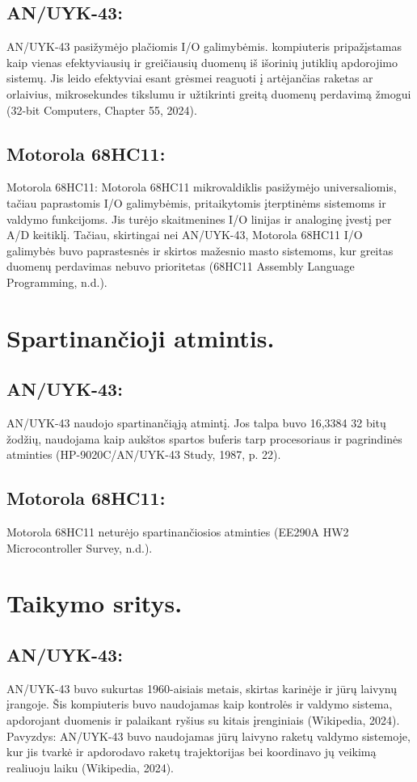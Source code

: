 \documentclass[a4paper,12pt]{article}
\begin{document}
\subsection{AN/UYK-43:}
AN/UYK-43 pasižymėjo plačiomis I/O galimybėmis. kompiuteris pripažįstamas kaip vienas efektyviausių ir greičiausių duomenų iš išorinių jutiklių apdorojimo sistemų. Jis leido efektyviai esant grėsmei reaguoti į artėjančias raketas ar orlaivius, mikrosekundes tikslumu ir užtikrinti greitą duomenų perdavimą žmogui (32-bit Computers, Chapter 55, 2024).
\subsection{Motorola 68HC11:}
Motorola 68HC11: Motorola 68HC11 mikrovaldiklis pasižymėjo universaliomis, tačiau paprastomis I/O galimybėmis, pritaikytomis įterptinėms sistemoms ir valdymo funkcijoms. Jis turėjo skaitmenines I/O linijas ir analoginę įvestį per A/D keitiklį. Tačiau, skirtingai nei AN/UYK-43, Motorola 68HC11 I/O galimybės buvo paprastesnės ir skirtos mažesnio masto sistemoms, kur greitas duomenų perdavimas nebuvo prioritetas (68HC11 Assembly Language Programming, n.d.).

\section{Spartinančioji atmintis.}
\subsection{AN/UYK-43:}
AN/UYK-43 naudojo spartinančiąją atmintį. Jos talpa buvo 16,3384 32 bitų žodžių, naudojama kaip aukštos spartos buferis tarp procesoriaus ir pagrindinės atminties (HP-9020C/AN/UYK-43 Study, 1987, p. 22).
\subsection{Motorola 68HC11:}
Motorola 68HC11 neturėjo spartinančiosios atminties (EE290A HW2 Microcontroller Survey, n.d.).

\section{Taikymo sritys.}
\subsection{AN/UYK-43:}
AN/UYK-43 buvo sukurtas 1960-aisiais metais, skirtas karinėje ir jūrų laivynų įrangoje. Šis kompiuteris buvo naudojamas kaip kontrolės ir valdymo sistema, apdorojant duomenis ir palaikant ryšius su kitais įrenginiais (Wikipedia, 2024). Pavyzdys: AN/UYK-43 buvo naudojamas jūrų laivyno raketų valdymo sistemoje, kur jis tvarkė ir apdorodavo raketų trajektorijas bei koordinavo jų veikimą realiuoju laiku (Wikipedia, 2024).
\end{document}
